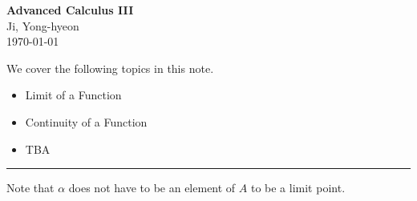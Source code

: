 \documentclass[11pt,openany]{article}
\begin{document}
\begin{center}
	\huge\textbf{Advanced Calculus III}\\
	\vspace{0.5em}
	\large{Ji, Yong-hyeon}\\
	\vspace{0.5em}
	\normalsize{\today}\\
\end{center}

\noindent 
We cover the following topics in this note.
\begin{itemize}
	\item Limit of a Function
	\item Continuity of a Function
	\item TBA
\end{itemize}
\hrule\vspace{12pt}
\begin{remark}
	Note that $\alpha$ does not have to be an element of $A$ to be a limit point.
\end{remark}
\end{document}
